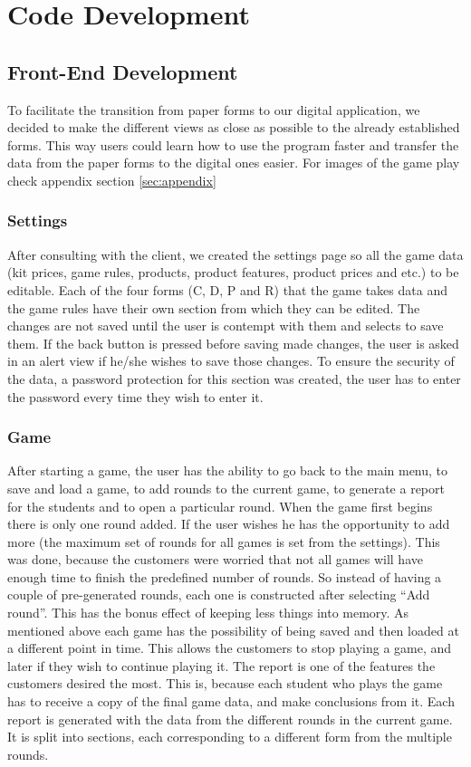 \documentclass{l3proj}
\begin{document}
\section{Code Development}
\label{sec:development}
\subsection{Front-End Development}

To facilitate the transition from paper forms to our digital application, we decided to make the different views as close as possible to the already established forms. This way users could learn how to use the program faster and transfer the data from the paper forms to the digital ones easier. For images of the game play check appendix section \ref{sec:appendix}

\subsubsection{Settings}
After consulting with the client, we created the settings page so all the game data (kit prices, game rules, products, product features, product prices and etc.) to be editable. Each of the four forms (C, D, P and R) that the game takes data and the game rules have their own section from which they can be edited. The changes are not saved until the user is contempt with them and selects to save them. If the back button is pressed before saving made changes, the user is asked in an alert view if he/she wishes to save those changes. To ensure the security of the data, a password protection for this section was created, the user has to enter the password every time they wish to enter it.


\subsubsection{Game}
After starting a game, the user has the ability to go back to the main menu, to save and load a game, to add rounds to the current game, to generate a report for the students and to open a particular round. 
When the game first begins there is only one round added. If the user wishes he has the opportunity to add more (the maximum set of rounds for all games is set from the settings). This was done, because the customers were worried that not all games will have enough time to finish the predefined number of rounds. So instead of having a couple of pre-generated rounds, each one is constructed after selecting “Add round”. This has the bonus effect of keeping less things into memory.
As mentioned above each game has the possibility of being saved and then loaded at a different point in time. This allows the customers to stop playing a game, and later if they wish to continue playing it.
The report is one of the features the customers desired the most. This is, because each student who plays the game has to receive a copy of the final game data, and make conclusions from it. Each report is generated with the data from the different rounds in the current game. It is split into sections, each corresponding to a different form from the multiple rounds.
\end{document}
